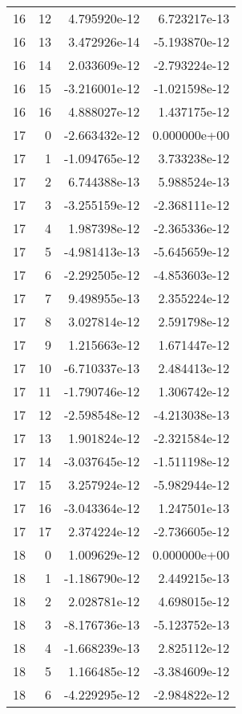 \begin{tabular}{rrrr}
  16 &   12 &  4.795920e-12 &  6.723217e-13 \\
  16 &   13 &  3.472926e-14 & -5.193870e-12 \\
  16 &   14 &  2.033609e-12 & -2.793224e-12 \\
  16 &   15 & -3.216001e-12 & -1.021598e-12 \\
  16 &   16 &  4.888027e-12 &  1.437175e-12 \\
  17 &    0 & -2.663432e-12 &  0.000000e+00 \\
  17 &    1 & -1.094765e-12 &  3.733238e-12 \\
  17 &    2 &  6.744388e-13 &  5.988524e-13 \\
  17 &    3 & -3.255159e-12 & -2.368111e-12 \\
  17 &    4 &  1.987398e-12 & -2.365336e-12 \\
  17 &    5 & -4.981413e-13 & -5.645659e-12 \\
  17 &    6 & -2.292505e-12 & -4.853603e-12 \\
  17 &    7 &  9.498955e-13 &  2.355224e-12 \\
  17 &    8 &  3.027814e-12 &  2.591798e-12 \\
  17 &    9 &  1.215663e-12 &  1.671447e-12 \\
  17 &   10 & -6.710337e-13 &  2.484413e-12 \\
  17 &   11 & -1.790746e-12 &  1.306742e-12 \\
  17 &   12 & -2.598548e-12 & -4.213038e-13 \\
  17 &   13 &  1.901824e-12 & -2.321584e-12 \\
  17 &   14 & -3.037645e-12 & -1.511198e-12 \\
  17 &   15 &  3.257924e-12 & -5.982944e-12 \\
  17 &   16 & -3.043364e-12 &  1.247501e-13 \\
  17 &   17 &  2.374224e-12 & -2.736605e-12 \\
  18 &    0 &  1.009629e-12 &  0.000000e+00 \\
  18 &    1 & -1.186790e-12 &  2.449215e-13 \\
  18 &    2 &  2.028781e-12 &  4.698015e-12 \\
  18 &    3 & -8.176736e-13 & -5.123752e-13 \\
  18 &    4 & -1.668239e-13 &  2.825112e-12 \\
  18 &    5 &  1.166485e-12 & -3.384609e-12 \\
  18 &    6 & -4.229295e-12 & -2.984822e-12 \\

\end{tabular}
